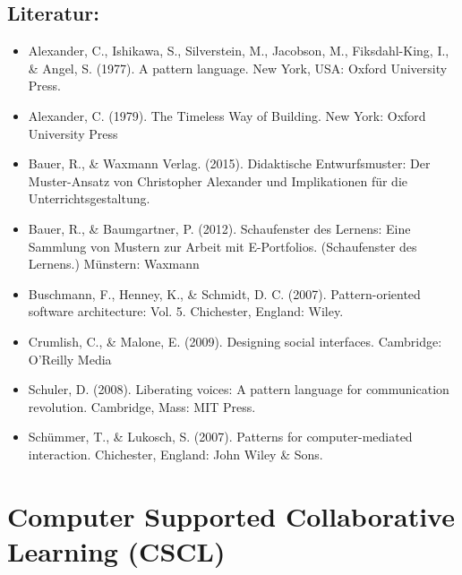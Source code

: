 \section*{Literatur:\label{/mi-2017/modulbeschreibungen-master/MA_SC_Soziotechnische_Entwurfsmuster}}\label{literaturpathlabelmi-2017modulbeschreibungen-mastermaux5fscux5fsoziotechnischeux5fentwurfsmuster}

\begin{itemize}
\tightlist
\item
  Alexander, C., Ishikawa, S., Silverstein, M., Jacobson, M.,
  Fiksdahl-King, I., \& Angel, S. (1977). A pattern language. New York,
  USA: Oxford University Press.
\item
  Alexander, C. (1979). The Timeless Way of Building. New York: Oxford
  University Press
\item
  Bauer, R., \& Waxmann Verlag. (2015). Didaktische Entwurfsmuster: Der
  Muster-Ansatz von Christopher Alexander und Implikationen für die
  Unterrichtsgestaltung.
\item
  Bauer, R., \& Baumgartner, P. (2012). Schaufenster des Lernens: Eine
  Sammlung von Mustern zur Arbeit mit E-Portfolios. (Schaufenster des
  Lernens.) Münstern: Waxmann
\item
  Buschmann, F., Henney, K., \& Schmidt, D. C. (2007). Pattern-oriented
  software architecture: Vol. 5. Chichester, England: Wiley.
\item
  Crumlish, C., \& Malone, E. (2009). Designing social interfaces.
  Cambridge: O'Reilly Media
\item
  Schuler, D. (2008). Liberating voices: A pattern language for
  communication revolution. Cambridge, Mass: MIT Press.
\item
  Schümmer, T., \& Lukosch, S. (2007). Patterns for computer-mediated
  interaction. Chichester, England: John Wiley \& Sons.
\end{itemize}

\chapter{Computer Supported Collaborative Learning
(CSCL)\label{/mi-2017/modulbeschreibungen-master/MA_SC_WPF_CSCL}}\label{computer-supported-collaborative-learning-csclpathlabelmi-2017modulbeschreibungen-mastermaux5fscux5fwpfux5fcscl}

